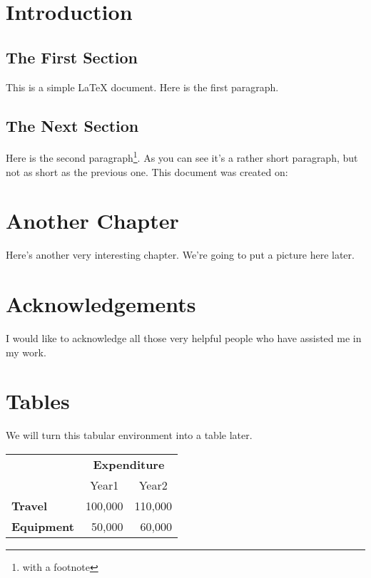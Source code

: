 
\chapter{Introduction} 

\section{The First Section} 
This is a simple LaTeX document.
Here is the first paragraph. 

\section{The Next Section} 
Here is the second paragraph\footnote{with a footnote}. 
As you can see it's a rather short paragraph, but not 
as short as the previous one. This document was 
created on: 

\chapter{Another Chapter} 

Here's another very interesting chapter. 
We're going to put a picture here later. 

\chapter*{Acknowledgements} 

I would like to acknowledge all those 
very helpful people who have assisted me in my work. 

\appendix 

\chapter{Tables} 
We will turn this tabular environment into a table later. 

\begin{tabular}{lrr} 
& \multicolumn{2}{c}{\bfseries Expenditure}\\ 
& \multicolumn{1}{c}{Year1} & \multicolumn{1}{c}{Year2}\\ 
\bfseries Travel & 100,000 & 110,000\\ 
\bfseries Equipment & 50,000 & 60,000 
\end{tabular} 